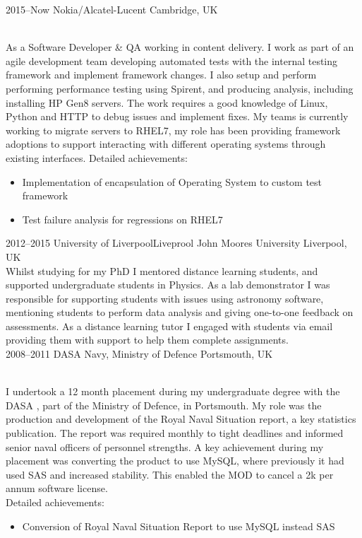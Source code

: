 \documentclass[]{cv-style}          %
\begin{document}
\begin{entrylist}
\entry
  {2015--Now}
  {Nokia/Alcatel-Lucent}
  {Cambridge, UK}
  {\\
As a Software Developer \& QA working in content delivery. I work as part of an agile development team developing automated tests with the internal testing framework and implement framework changes. I also setup and perform performing performance testing using Spirent, and producing analysis, including installing HP Gen8 servers. The work requires a good knowledge of Linux, Python and HTTP to debug issues and implement fixes. My teams is currently working to migrate servers to RHEL7, my role has been providing framework adoptions to support interacting with different operating systems through existing interfaces. 
Detailed achievements:
\begin{itemize}
  \item Implementation of encapsulation of Operating System to custom test framework 
  \item Test failure analysis for regressions on RHEL7
\end{itemize}
}
\entry
  {2012--2015}
  {University of Liverpool\/Liveprool John Moores University}
  {Liverpool, UK}
  {\\
  Whilst studying for my PhD I mentored distance learning students, and supported undergraduate students in Physics. As a lab demonstrator I was responsible for supporting students with issues using astronomy software, mentioning students to perform data analysis and giving one-to-one feedback on assessments.  As a distance learning tutor I engaged with students via email providing them with support to help them complete assignments.\\
  }
\entry
  {2008--2011}
  {DASA Navy, Ministry of Defence}
  {Portsmouth, UK}
  {\\
  I undertook a 12 month placement during my undergraduate degree with the DASA , part of the Ministry of Defence, in Portsmouth. My role was the production and development of the Royal Naval Situation report, a key statistics publication. The report was required monthly to tight deadlines and informed senior naval officers of personnel strengths. A key achievement during my placement was converting the product to use MySQL, where previously it had used SAS and increased stability. This enabled the MOD to cancel a 2k per annum software license.\\
  Detailed achievements:
  \begin{itemize}
    \item Conversion of Royal Naval Situation Report to use MySQL instead SAS
  \end{itemize}
  }
\end{entrylist}
\end{document}
